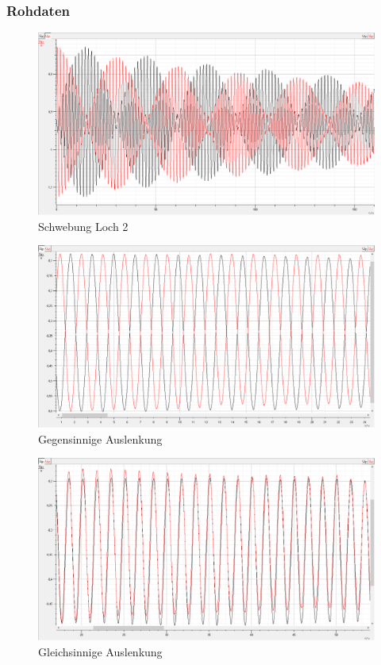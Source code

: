 \documentclass[12pt,a4paper]{article}
\begin{document}
\subsubsection{Rohdaten}
\begin{figure}[H]
\centering
\includegraphics[scale=0.6]{Bilder/Schwebung.png}
\caption{Schwebung Loch 2}
\end{figure}
\begin{figure}[H]
\centering
\includegraphics[scale=0.6]{Bilder/Gegensinnig.png}
\caption{Gegensinnige Auslenkung}
\end{figure}
\begin{figure}[H]
\centering
\includegraphics[scale=0.5]{Bilder/Gleichsinnig.png}
\caption{Gleichsinnige Auslenkung}
\end{figure}
\end{document}
